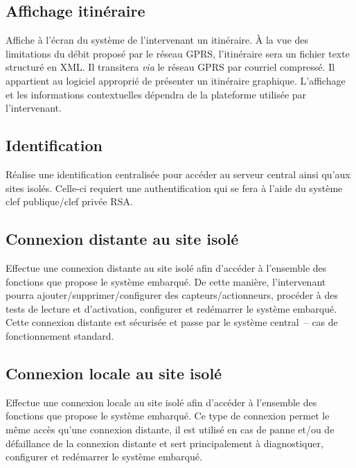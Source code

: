 \documentclass[a4paper, 11pt, final]{article}
\begin{document}
\subsection{Affichage itinéraire}
Affiche à l'écran du système de l'intervenant un itinéraire. À la vue des limitations du débit proposé par le réseau GPRS, l'itinéraire sera un fichier texte structuré en XML. Il transitera \textit{via} le réseau GPRS par courriel compressé. Il appartient au logiciel approprié de présenter un itinéraire graphique. L'affichage et les informations contextuelles dépendra de la plateforme utilisée par l'intervenant.

\subsection{Identification}
Réalise une identification centralisée pour accéder au serveur central ainsi qu'aux sites isolés. Celle-ci requiert une authentification qui se fera à l'aide du système clef publique/clef privée RSA.

\subsection{Connexion distante au site isolé}
Effectue une connexion distante au site isolé afin d'accéder à l'ensemble des fonctions que propose le système embarqué. De cette manière, l'intervenant pourra ajouter/supprimer/configurer des capteurs/actionneurs, procéder à des tests de lecture et d'activation, configurer et redémarrer le système embarqué. Cette connexion distante est sécurisée et passe par le système central~-- cas de fonctionnement standard.

\subsection{Connexion locale au site isolé}
Effectue une connexion locale au site isolé afin d'accéder à l'ensemble des fonctions que propose le système embarqué. Ce type de connexion permet le même accès qu'une connexion distante, il est utilisé en cas de panne et/ou de défaillance de la connexion distante et sert principalement à diagnostiquer, configurer et redémarrer le système embarqué.
\end{document}
